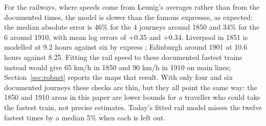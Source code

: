 \documentclass[11pt,a4paper]{article}
\begin{document}
For the railways, where speeds come from Leunig's averages rather than from the documented times, the model is slower than the famous expresses, as expected: the median absolute error is 46\% for the 4 journeys around 1850 and 34\% for the 6 around 1910, with mean log errors of +0.35 and +0.34. Liverpool in 1851 is modelled at 9.2 hours against six by express \citep{sidney1851}; Edinburgh around 1901 at 10.6 hours against 8.25. Fitting the rail speed to these documented fastest trains instead would give 65 km/h in 1850 and 90 km/h in 1910 on main lines; Section~\ref{sec:robust} reports the maps that result. With only four and six documented journeys these checks are thin, but they all point the same way: the 1850 and 1910 areas in this paper are lower bounds for a traveller who could take the fastest train, not precise estimates. Today's fitted rail model misses the twelve fastest times by a median 5\% when each is left out.
\end{document}
